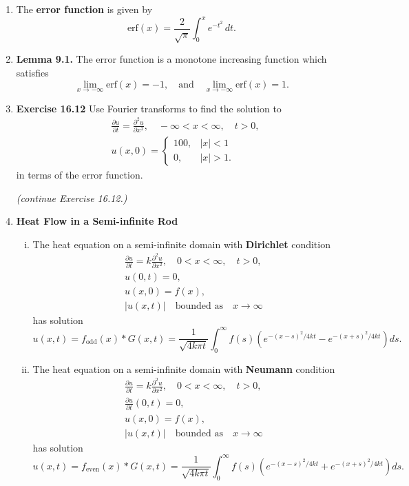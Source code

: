 \begin{enumerate}
\item The \textbf{error function} is given by
\[\text{erf}(x)=\frac{2}{\sqrt{\pi}} \int_{0}^{x}e^{-t^{2}}\, dt. \]


\item \textbf{Lemma 9.1.} The error function is a monotone increasing function which satisfies
\[\lim_{x\to -\infty} \text{erf}(x)=-1,\quad \text{and}\quad \lim_{x\to -\infty} \text{erf}(x)=1.\]




\item \textbf{Exercise 16.12}
Use Fourier transforms to find the solution to
\begin{align*}
    & \frac{\partial u}{\partial t}= \frac{\partial ^{2} u}{\partial x^{2}}, \quad -\infty<x<\infty, \quad t>0,\\
    & u(x,0)=\begin{cases}
               100, & |x|<1 \\
               0, & |x|>1.
             \end{cases}
\end{align*}
in terms of the error function.

\newpage \textit{(continue Exercise 16.12.)}

\newpage

\item \textbf{Heat Flow in a Semi-infinite Rod} 

\begin{enumerate}[(i)]
 \item  The heat equation on a semi-infinite domain with \textbf{Dirichlet} condition
\begin{align*}
    & \frac{\partial u}{\partial t}=k \frac{\partial ^{2} u}{\partial x^{2}}, \quad 0<x<\infty, \quad t>0,\\
    & u(0,t) = 0, \\
    & u(x,0)=f(x), \\
    & |u(x,t)| \quad \text{bounded as} \quad x\to \infty
\end{align*}
has solution
\[u(x,t) = f_{\text{odd}}(x)*G(x,t) = \frac{1}{\sqrt{4k\pi t}}\int_{0}^{\infty} f(s) \left( e^{-(x-s)^{2}/4kt} - e^{-(x+s)^{2}/4kt} \right) ds. \]


\item The heat equation on a semi-infinite domain with \textbf{Neumann} condition
\begin{align*}
    & \frac{\partial u}{\partial t}=k \frac{\partial ^{2} u}{\partial x^{2}}, \quad 0<x<\infty, \quad t>0,\\
    & \frac{\partial u}{\partial t}(0,t) = 0, \\
    & u(x,0)=f(x), \\
    & |u(x,t)| \quad \text{bounded as} \quad x\to  \infty
\end{align*}
has solution
\[u(x,t) = f_{\text{even}}(x)*G(x,t) = \frac{1}{\sqrt{4k\pi t}}\int_{0}^{\infty} f(s) \left( e^{-(x-s)^{2}/4kt} + e^{-(x+s)^{2}/4kt} \right) ds. \]

\end{enumerate}




\end{enumerate}




